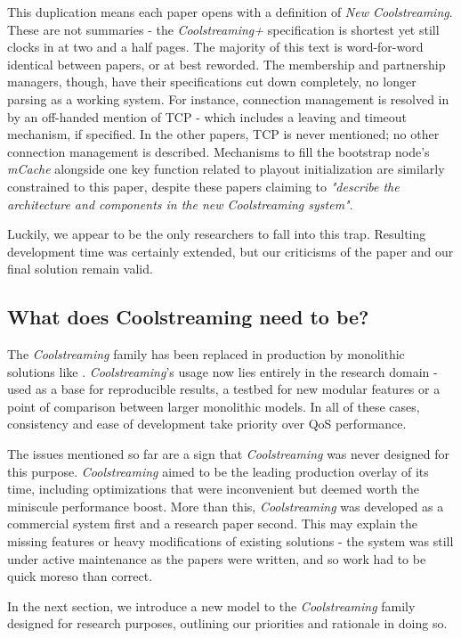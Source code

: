 \documentclass[12pt,a4paper]{article}
\begin{document}
This duplication means each paper opens with a definition of \textit{New Coolstreaming}. These are not summaries - the \textit{Coolstreaming+} specification is shortest yet still clocks in at two and a half pages. The majority of this text is word-for-word identical between papers, or at best reworded. The membership and partnership managers, though, have their specifications cut down completely, no longer parsing as a working system. For instance, connection management is resolved in \cite{Xie2007} by an off-handed mention of TCP - which includes a leaving and timeout mechanism, if specified. In the other papers, TCP is never mentioned; no other connection management is described. Mechanisms to fill the bootstrap node's \textit{mCache} alongside one key function related to playout initialization are similarly constrained to this paper, despite these papers claiming to \textit{"describe the architecture and components in the new Coolstreaming system"}.

Luckily, we appear to be the only researchers to fall into this trap. Resulting development time was certainly extended, but our criticisms of the paper and our final solution remain valid.

\subsection{What does Coolstreaming need to be?} \label{problems:what}
The \textit{Coolstreaming} family has been replaced in production by monolithic solutions like . \textit{Coolstreaming}'s usage now lies entirely in the research domain - used as a base for reproducible results, a testbed for new modular features or a point of comparison between larger monolithic models. In all of these cases, consistency and ease of development take priority over QoS performance.

The issues mentioned so far are a sign that \textit{Coolstreaming} was never designed for this purpose. \textit{Coolstreaming} aimed to be the leading production overlay of its time, including optimizations that were inconvenient but deemed worth the miniscule performance boost. More than this, \textit{Coolstreaming} was developed as a commercial system first and a research paper second. This may explain the missing features or heavy modifications of existing solutions - the system was still under active maintenance as the papers were written, and so work had to be quick moreso than correct.

In the next section, we introduce a new model to the \textit{Coolstreaming} family designed for research purposes, outlining our priorities and rationale in doing so.
\end{document}
